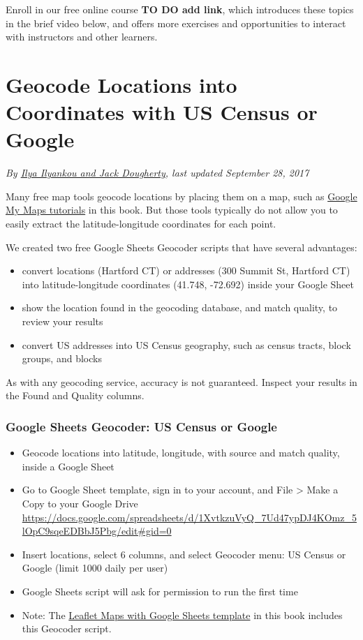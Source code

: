 \documentclass[
  english,
]{book}
\providecommand{\tightlist}{%
  \setlength{\itemsep}{0pt}\setlength{\parskip}{0pt}}
\begin{document}
Enroll in our free online course \textbf{TO DO add link}, which introduces these topics in the brief video below, and offers more exercises and opportunities to interact with instructors and other learners.

\hypertarget{geocode}{%
\section{Geocode Locations into Coordinates with US Census or Google}\label{geocode}}

\emph{By \href{authors}{Ilya Ilyankou and Jack Dougherty}, last updated September 28, 2017}

Many free map tools geocode locations by placing them on a map, such as \href{/mymaps}{Google My Maps tutorials} in this book. But those tools typically do not allow you to easily extract the latitude-longitude coordinates for each point.

We created two free Google Sheets Geocoder scripts that have several advantages:

\begin{itemize}
\tightlist
\item
  convert locations (Hartford CT) or addresses (300 Summit St, Hartford CT) into latitude-longitude coordinates (41.748, -72.692) inside your Google Sheet
\item
  show the location found in the geocoding database, and match quality, to review your results
\item
  convert US addresses into US Census geography, such as census tracts, block groups, and blocks
\end{itemize}

As with any geocoding service, accuracy is not guaranteed. Inspect your results in the Found and Quality columns.

\hypertarget{google-sheets-geocoder-us-census-or-google}{%
\subsubsection*{Google Sheets Geocoder: US Census or Google}\label{google-sheets-geocoder-us-census-or-google}}

\begin{itemize}
\tightlist
\item
  Geocode locations into latitude, longitude, with source and match quality, inside a Google Sheet
\item
  Go to Google Sheet template, sign in to your account, and File \textgreater{} Make a Copy to your Google Drive \url{https://docs.google.com/spreadsheets/d/1XvtkzuVyQ_7Ud47ypDJ4KOmz_5lOpC9sqeEDBbJ5Pbg/edit\#gid=0}
\item
  Insert locations, select 6 columns, and select Geocoder menu: US Census or Google (limit 1000 daily per user)
\item
  Google Sheets script will ask for permission to run the first time
\item
  Note: The \href{leaflet-maps-with-google-sheets}{Leaflet Maps with Google Sheets template} in this book includes this Geocoder script.
\end{itemize}
\end{document}
